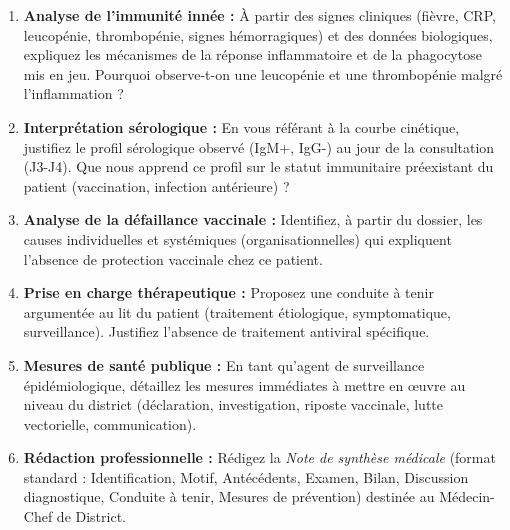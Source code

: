 \documentclass[11pt]{article}
\newcounter{popsec}
\newcounter{popsub}
\newcommand{\courssub}[1]{%
  \stepcounter{popsub}%
  \par\vspace{9pt}\noindent{\popxbold\fontsize{11.5}{13}\selectfont\color{popink}{\color{poporange}\thepopsec.\thepopsub}\hspace{6pt}#1}\par\nopagebreak\vspace{4pt}
}
\begin{document}
\courssub{Consignes}
\begin{enumerate}
    \item \textbf{Analyse de l'immunité innée :} À partir des signes cliniques (fièvre, CRP, leucopénie, thrombopénie, signes hémorragiques) et des données biologiques, expliquez les mécanismes de la réponse inflammatoire et de la phagocytose mis en jeu. Pourquoi observe-t-on une leucopénie et une thrombopénie malgré l'inflammation ?
    \item \textbf{Interprétation sérologique :} En vous référant à la courbe cinétique, justifiez le profil sérologique observé (IgM+, IgG-) au jour de la consultation (J3-J4). Que nous apprend ce profil sur le statut immunitaire préexistant du patient (vaccination, infection antérieure) ?
    \item \textbf{Analyse de la défaillance vaccinale :} Identifiez, à partir du dossier, les causes individuelles et systémiques (organisationnelles) qui expliquent l'absence de protection vaccinale chez ce patient.
    \item \textbf{Prise en charge thérapeutique :} Proposez une conduite à tenir argumentée au lit du patient (traitement étiologique, symptomatique, surveillance). Justifiez l'absence de traitement antiviral spécifique.
    \item \textbf{Mesures de santé publique :} En tant qu'agent de surveillance épidémiologique, détaillez les mesures immédiates à mettre en œuvre au niveau du district (déclaration, investigation, riposte vaccinale, lutte vectorielle, communication).
    \item \textbf{Rédaction professionnelle :} Rédigez la \emph{Note de synthèse médicale} (format standard : Identification, Motif, Antécédents, Examen, Bilan, Discussion diagnostique, Conduite à tenir, Mesures de prévention) destinée au Médecin-Chef de District.
\end{enumerate}
\end{document}
